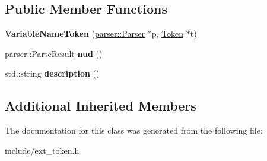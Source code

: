 \subsection*{Public Member Functions}
\begin{DoxyCompactItemize}
\item 
{\bfseries Variable\+Name\+Token} (\hyperlink{classfcal_1_1parser_1_1Parser}{parser\+::\+Parser} $\ast$p, \hyperlink{classfcal_1_1scanner_1_1Token}{Token} $\ast$t)\hypertarget{classfcal_1_1scanner_1_1VariableNameToken_ab76c50eb69e6b72c5323868001f2bede}{}\label{classfcal_1_1scanner_1_1VariableNameToken_ab76c50eb69e6b72c5323868001f2bede}

\item 
\hyperlink{classfcal_1_1parser_1_1ParseResult}{parser\+::\+Parse\+Result} {\bfseries nud} ()\hypertarget{classfcal_1_1scanner_1_1VariableNameToken_aff6fe66d29fa17a8efb5c54a93847524}{}\label{classfcal_1_1scanner_1_1VariableNameToken_aff6fe66d29fa17a8efb5c54a93847524}

\item 
std\+::string {\bfseries description} ()\hypertarget{classfcal_1_1scanner_1_1VariableNameToken_acb8500279c7a3a25cf19f7f1aea52923}{}\label{classfcal_1_1scanner_1_1VariableNameToken_acb8500279c7a3a25cf19f7f1aea52923}

\end{DoxyCompactItemize}
\subsection*{Additional Inherited Members}


The documentation for this class was generated from the following file\+:\begin{DoxyCompactItemize}
\item 
include/ext\+\_\+token.\+h\end{DoxyCompactItemize}
